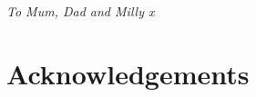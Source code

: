 \documentclass[11pt, a4paper, twosided]{book}
\newcommand{\thesisauthor}{Holly Amelia Rebecca Giles}
\newcommand{\thesisdate}{Dec 05, 2021}
\begin{document}
\newpage
\thispagestyle{empty}
%
%
%
%

\pagestyle{empty} %





\vspace*{\fill}
\begin{center}
\textit{To Mum, Dad and Milly x}
\end{center}
\vspace*{\fill}
\newpage\null\thispagestyle{empty}\newpage

\pagestyle{plain}
\setcounter{page}{1}    %
\newpage
\hypertarget{acknowledgements}{%
\chapter*{Acknowledgements}\label{acknowledgements}}
\end{document}
